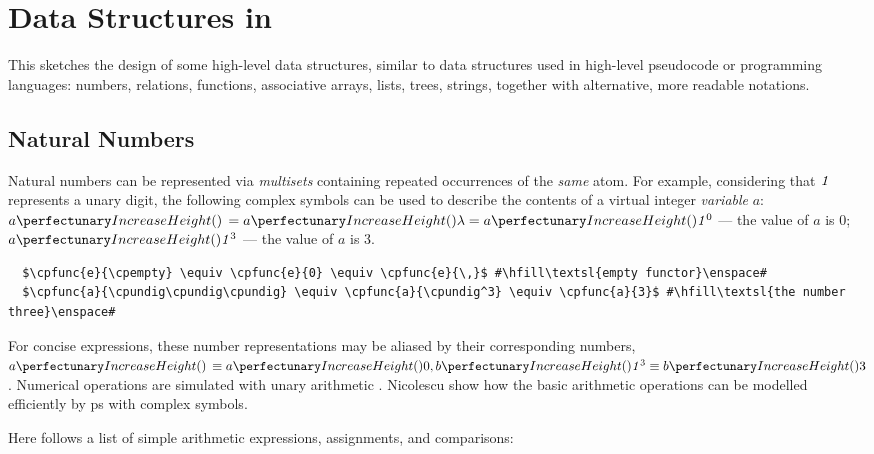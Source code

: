 \section{Data Structures in }\label{sec:cps:datastructures}

This  sketches the design of some high-level data structures, 
similar to data structures used in high-level pseudocode or programming languages:
numbers, relations, functions, associative arrays, lists, trees, strings, 
together with alternative, more readable notations.

\subsection{\label{sec:cps:natnums}Natural Numbers}
Natural numbers can be represented via \emph{multisets} containing repeated occurrences of the \emph{same} atom.
For example, considering that \(\mathit{1}\) represents a unary digit, 
the following complex symbols can be used to describe 
the contents of a virtual integer \emph{variable} \(a\): 
\(\cpfunc{a}{\,} = \cpfunc{a}{\cpempty} = \cpfunc{a}{\cpundig^0}\) --- the value of \(a\) is 0;
\(\cpfunc{a}{\cpundig^3}\) --- the value of \(a\) is 3.

\lstset{xleftmargin=.5in, xrightmargin=.5in} 
\begin{lstlisting}
  $\cpfunc{e}{\cpempty} \equiv \cpfunc{e}{0} \equiv \cpfunc{e}{\,}$ #\hfill\textsl{empty functor}\enspace#
  $\cpfunc{a}{\cpundig\cpundig\cpundig} \equiv \cpfunc{a}{\cpundig^3} \equiv \cpfunc{a}{3}$ #\hfill\textsl{the number three}\enspace#
\end{lstlisting}

For concise expressions, these number representations may be aliased by their corresponding numbers, \eg{}~\(\cpfunc{a}{\,} \equiv \cpfunc{a}{0}, \cpfunc{b}{\cpundig^3} \equiv \cpfunc{b}{3}\).  Numerical operations are simulated with unary arithmetic \cite{Aman2019,Bonchis2006}.
Nicolescu \etal{} \cite{Nicolescu2014,RN-HW-ROMJIST14} show how the basic arithmetic operations can be modelled efficiently by \gls{ps} with complex symbols.

Here follows a list of simple arithmetic expressions, assignments, and comparisons:

